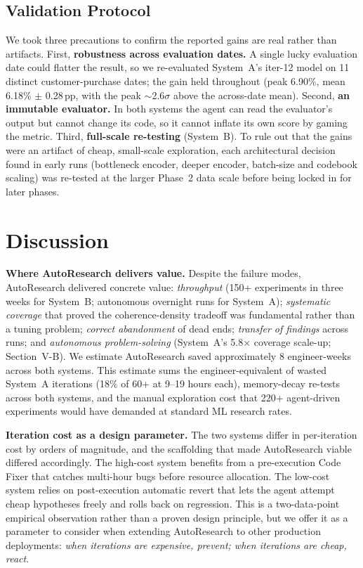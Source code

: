 \documentclass[conference]{IEEEtran}
\begin{document}
\subsection{Validation Protocol}
We took three precautions to confirm the reported gains are real rather than artifacts. First, \textbf{robustness across evaluation dates.} A single lucky evaluation date could flatter the result, so we re-evaluated System~A's iter-12 model on 11 distinct customer-purchase dates; the gain held throughout (peak 6.90\%, mean 6.18\% $\pm$ 0.28\,pp, with the peak ${\sim}$2.6$\sigma$ above the across-date mean). Second, \textbf{an immutable evaluator.} In both systems the agent can read the evaluator's output but cannot change its code, so it cannot inflate its own score by gaming the metric. Third, \textbf{full-scale re-testing} (System~B). To rule out that the gains were an artifact of cheap, small-scale exploration, each architectural decision found in early runs (bottleneck encoder, deeper encoder, batch-size and codebook scaling) was re-tested at the larger Phase~2 data scale before being locked in for later phases.

\section{Discussion}

\textbf{Where AutoResearch delivers value.} Despite the failure modes, AutoResearch delivered concrete value: \textit{throughput} (150+ experiments in three weeks for System~B; autonomous overnight runs for System~A); \textit{systematic coverage} that proved the coherence-density tradeoff was fundamental rather than a tuning problem; \textit{correct abandonment} of dead ends; \textit{transfer of findings} across runs; and \textit{autonomous problem-solving} (System~A's 5.8$\times$ coverage scale-up; Section~V-B). We estimate AutoResearch saved approximately 8 engineer-weeks across both systems. This estimate sums the engineer-equivalent of wasted System~A iterations (18\% of 60+ at 9--19 hours each), memory-decay re-tests across both systems, and the manual exploration cost that 220+ agent-driven experiments would have demanded at standard ML research rates.


\textbf{Iteration cost as a design parameter.} The two systems differ in per-iteration cost by orders of magnitude, and the scaffolding that made AutoResearch viable differed accordingly. The high-cost system benefits from a pre-execution Code Fixer that catches multi-hour bugs before resource allocation. The low-cost system relies on post-execution automatic revert that lets the agent attempt cheap hypotheses freely and rolls back on regression. This is a two-data-point empirical observation rather than a proven design principle, but we offer it as a parameter to consider when extending AutoResearch to other production deployments: \textit{when iterations are expensive, prevent; when iterations are cheap, react}.
\end{document}
